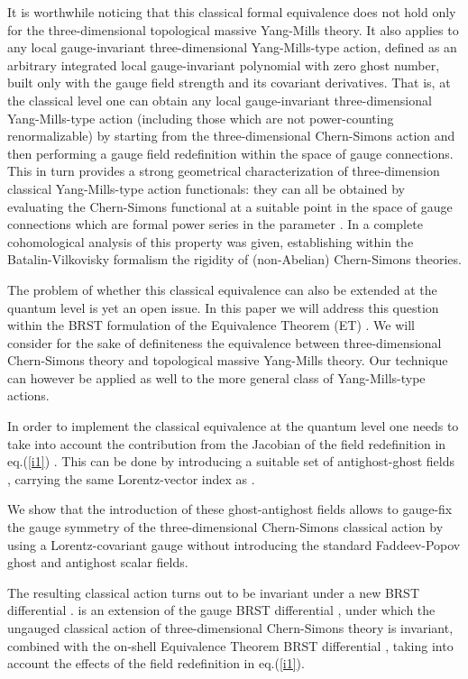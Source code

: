 \documentclass[a4paper,11pt]{article}
\begin{document}
It is worthwhile noticing that this classical formal equivalence 
does not hold only for the three-dimensional 
topological massive Yang-Mills theory. It also applies
\cite{sorella2,Barnich:vg} to any local gauge-invariant
three-dimensional 
Yang-Mills-type action, defined as an arbitrary integrated local
gauge-invariant polynomial with zero ghost number,
built only with the gauge field strength and its covariant
derivatives. That is, at the classical level one can obtain
any local gauge-invariant three-dimensional Yang-Mills-type action (including those
which are not power-counting renormalizable) by starting
from the three-dimensional Chern-Simons action and then performing
a gauge field redefinition within the space of gauge connections.
This in turn provides a strong geometrical characterization
\cite{sorella2} of
three-dimension classical Yang-Mills-type action functionals: they 
can all be obtained
by evaluating the Chern-Simons functional at a suitable point
in the space of gauge connections which are formal power series
in the parameter \myHighlight{$\lambda$}\coordHE{}.
In \cite{Barnich:vg} a complete cohomological analysis of this
property was given, establishing within the Batalin-Vilkovisky
formalism the rigidity of (non-Abelian) Chern-Simons theories.

The problem of whether this classical equivalence can also be extended
at the quantum level is yet an open issue. 
In this paper we will address this question within 
the BRST formulation of the Equivalence Theorem (ET) \cite{ET}.
We will consider for the sake of definiteness the equivalence
between three-dimensional Chern-Simons theory and topological 
massive Yang-Mills theory.
Our technique can however be applied as well to the more general
class of Yang-Mills-type actions.

In order to implement the classical equivalence at the quantum level
one needs to take into account the contribution from the Jacobian
of the field  redefinition in eq.(\ref{i1}) \cite{ET}.
This can be done by introducing
a suitable set of antighost-ghost fields \coordHE{}, carrying the
same Lorentz-vector index as \coordHE{}.

We show that 
the introduction of these ghost-antighost fields
allows to gauge-fix the gauge symmetry of the three-dimensional
Chern-Simons classical action by using a Lorentz-covariant gauge
without introducing the standard Faddeev-Popov 
ghost and antighost scalar fields.

The resulting classical action turns out to be invariant under a new BRST
differential \coordHE{}. 
%
\coordHE{} is
an extension of the gauge BRST differential \coordHE{}, under which the ungauged
classical action of three-dimensional Chern-Simons theory is invariant,
 combined with
the on-shell Equivalence Theorem BRST differential  \cite{ET} \myHighlight{$\delta$}\coordHE{},
taking into account the effects of the field redefinition in eq.(\ref{i1}).
\end{document}
